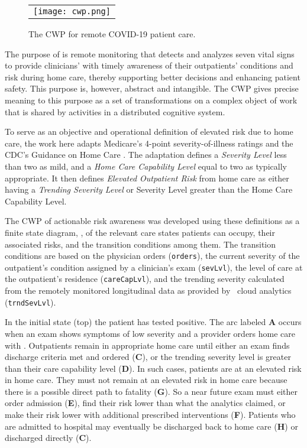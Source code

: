 \begin{figure*}[t]
  \begin{center}
    \begin{tabular}{c}
      \texttt{[image: cwp.png]}
    \end{tabular}
  \end{center}
\caption{The CWP for remote COVID-19 patient care.}
\label{fig:cwp}
\end{figure*}

The purpose of \phware is remote monitoring that detects and analyzes seven vital signs to provide clinicians' with timely awareness of their outpatients' conditions and risk during home care, thereby supporting better decisions and enhancing patient safety. This purpose is, however, abstract and intangible. The CWP gives precise meaning to this purpose as a set of transformations on a complex object of work that is shared by activities in a distributed cognitive system.

To serve as an objective and operational definition of elevated risk due to home care, the work here adapts Medicare's 4-point severity-of-illness ratings \cite{Hornbrook2005OverviewOD,severity} and the CDC's Guidance on Home Care \cite{cdc}. The adaptation defines a \emph{Severity Level} less than two as mild, and a \emph{Home Care Capability Level} equal to two as typically appropriate. It then defines \emph{Elevated Outpatient Risk} from home care as either having a \emph{Trending Severity Level} or Severity Level greater than the Home Care Capability Level.

The CWP of actionable risk awareness was developed using these definitions as a finite state diagram, , of the relevant care states patients can occupy, their associated risks, and the transition conditions among them. The transition conditions are based on the physician orders (\texttt{orders}), the current severity of the outpatient's condition assigned by a clinician's exam (\texttt{sevLvl}), the level of care at the outpatient's residence (\texttt{careCapLvl}), and the trending severity calculated from the remotely monitored longitudinal data as provided by
\phware\ cloud analytics (\texttt{trndSevLvl}). 

In the initial state (top) the patient has tested positive. The arc labeled \textbf{A} occurs when an exam shows symptoms of low severity and a provider orders home care with \phware. Outpatients remain in appropriate home care until either an exam finds discharge criteria met and ordered (\textbf{C}), or the trending severity level is greater than their care capability level (\textbf{D}). In such cases, patients are at an elevated risk in home care. They must not remain at an elevated risk in home care because there is a possible direct path to fatality (\textbf{G}). So a near future exam must either order admission (\textbf{E}), find their risk lower than what the analytics claimed, or make their risk lower with additional prescribed interventions (\textbf{F}). Patients who are admitted to hospital may eventually be discharged back to home care (\textbf{H}) or discharged directly (\textbf{C}). 

